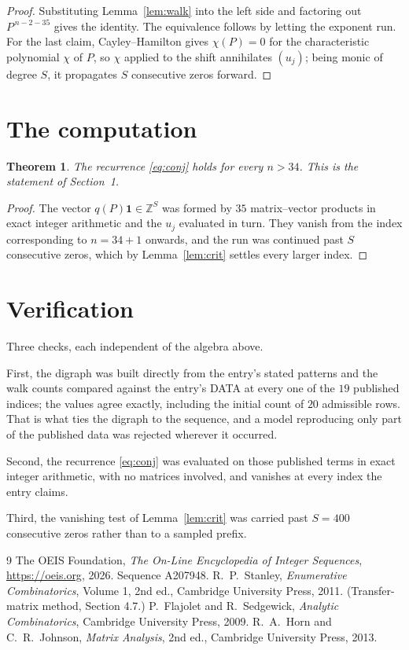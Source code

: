 \documentclass[11pt,a4paper]{article}
\theoremstyle{plain}
\newtheorem{theorem}{Theorem}
\theoremstyle{definition}
\begin{document}
\begin{proof}
Substituting Lemma~\ref{lem:walk} into the left side and factoring out
$P^{\,n-2-35}$ gives the identity. The equivalence follows by letting the exponent
run. For the last claim, Cayley--Hamilton gives $\chi(P)=0$ for the characteristic
polynomial $\chi$ of $P$, so $\chi$ applied to the shift annihilates $(u_j)$; being monic of
degree $S$, it propagates $S$ consecutive zeros forward.
\end{proof}

\section{The computation}

\begin{theorem}
The recurrence \eqref{eq:conj} holds for every $n>34$. This is the statement of
Section~1.
\end{theorem}

\begin{proof}
The vector $q(P)\mathbf{1}\in\mathbb{Z}^{S}$ was formed by $35$ matrix--vector
products in exact integer arithmetic and the $u_j$ evaluated in turn. They vanish from the
index corresponding to $n=34+1$ onwards, and the run was continued past $S$ consecutive
zeros, which by Lemma~\ref{lem:crit} settles every larger index.
\end{proof}

\section{Verification}

Three checks, each independent of the algebra above.

First, the digraph was built directly from the entry's stated patterns and the walk counts
compared against the entry's DATA at every one of the $19$ published indices; the
values agree exactly, including the initial count of $20$ admissible rows. That is
what ties the digraph to the sequence, and a model reproducing only part of the published
data was rejected wherever it occurred.

Second, the recurrence \eqref{eq:conj} was evaluated on those published terms in exact
integer arithmetic, with no matrices involved, and vanishes at every index the entry claims.

Third, the vanishing test of Lemma~\ref{lem:crit} was carried past $S=400$ consecutive
zeros rather than to a sampled prefix.

\begin{thebibliography}{9}
 The OEIS Foundation, \emph{The On-Line Encyclopedia of Integer
Sequences}, \url{https://oeis.org}, 2026. Sequence A207948.
 R.~P.~Stanley, \emph{Enumerative Combinatorics}, Volume 1, 2nd ed.,
Cambridge University Press, 2011. (Transfer-matrix method, Section 4.7.)
 P.~Flajolet and R.~Sedgewick, \emph{Analytic Combinatorics}, Cambridge
University Press, 2009.
 R.~A.~Horn and C.~R.~Johnson, \emph{Matrix Analysis}, 2nd ed., Cambridge
University Press, 2013.
\end{thebibliography}
\end{document}
